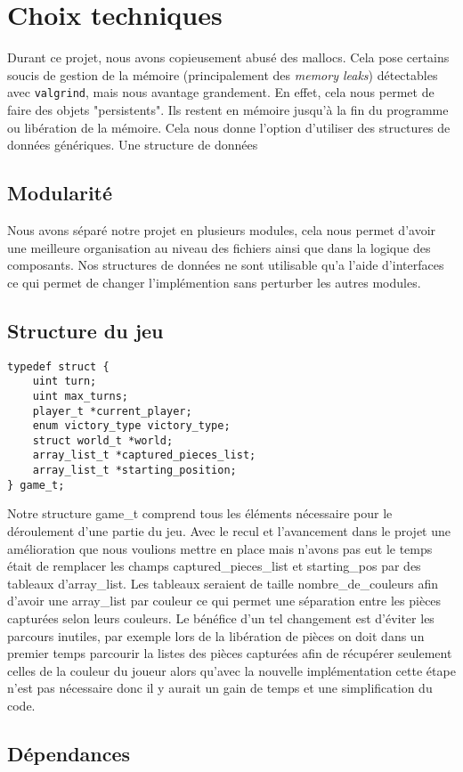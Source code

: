 \section{Choix techniques}
Durant ce projet, nous avons copieusement abusé des mallocs. Cela pose
certains soucis de gestion de la mémoire (principalement des \emph{memory leaks})
détectables avec \verb|valgrind|, mais nous avantage grandement.
En effet, cela nous permet de faire des
objets "persistents". Ils restent en mémoire jusqu'à la fin du programme
ou libération de la mémoire. Cela nous donne l'option d'utiliser des
structures de données génériques. Une structure de données

\subsection{Modularité}
Nous avons séparé notre projet en plusieurs modules, cela nous permet d'avoir une meilleure organisation au niveau des fichiers
ainsi que dans la logique des composants. Nos structures de données ne sont utilisable qu'a l'aide d'interfaces ce qui permet de changer
l'implémention sans perturber les autres modules. 


\subsection{Structure du jeu}

\begin{verbatim}
typedef struct {
    uint turn;
    uint max_turns;
    player_t *current_player;
    enum victory_type victory_type;
    struct world_t *world;
    array_list_t *captured_pieces_list;
    array_list_t *starting_position;
} game_t;
\end{verbatim}


Notre structure game\_t comprend tous les éléments nécessaire pour le déroulement
d'une partie du jeu.
Avec le recul et l'avancement dans le projet une amélioration que nous voulions mettre en place mais n'avons
pas eut le temps était de remplacer les champs captured\_pieces\_list et starting\_pos par des tableaux d'array\_list.
Les tableaux seraient de taille nombre\_de\_couleurs afin d'avoir une array\_list par couleur ce qui permet
une séparation entre les pièces capturées selon leurs couleurs. Le bénéfice d'un tel changement est 
d'éviter les parcours inutiles, par exemple lors de la libération de pièces on doit dans un premier temps
parcourir la listes des pièces capturées afin de récupérer seulement celles de la couleur du joueur alors
qu'avec la nouvelle implémentation cette étape n'est pas nécessaire donc il y aurait un gain de temps et
une simplification du code.  

\subsection{Dépendances}


